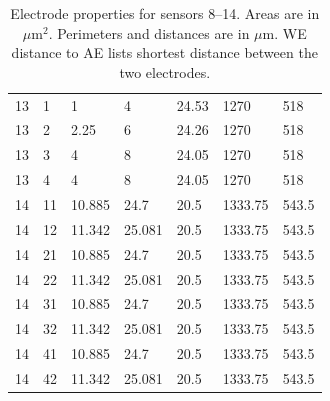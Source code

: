 \begin{table}
\begin{tabular}{lllllll}
		13 & 1 & 1 & 4 & 24.53 & 1270 & 518 \\
		13 & 2 & 2.25 & 6 & 24.26 & 1270 & 518 \\
		13 & 3 & 4 & 8 & 24.05 & 1270 & 518 \\
		13 & 4 & 4 & 8 & 24.05 & 1270 & 518 \\
		14 & 11 & 10.885 & 24.7 & 20.5 & 1333.75 & 543.5 \\
		14 & 12 & 11.342 & 25.081 & 20.5 & 1333.75 & 543.5 \\
		14 & 21 & 10.885 & 24.7 & 20.5 & 1333.75 & 543.5 \\
		14 & 22 & 11.342 & 25.081 & 20.5 & 1333.75 & 543.5 \\
		14 & 31 & 10.885 & 24.7 & 20.5 & 1333.75 & 543.5 \\
		14 & 32 & 11.342 & 25.081 & 20.5 & 1333.75 & 543.5 \\
		14 & 41 & 10.885 & 24.7 & 20.5 & 1333.75 & 543.5 \\
		14 & 42 & 11.342 & 25.081 & 20.5 & 1333.75 & 543.5
	\end{tabular}
	\caption[Electrode properties for sensors 8--14]{Electrode properties for sensors 8--14. Areas are in $\mu \mathrm{m}^2$. Perimeters and distances are in $\mu \mathrm{m}$. WE distance to AE lists shortest distance between the two electrodes.}
	\label{electrode-properties-2}
\end{table}

